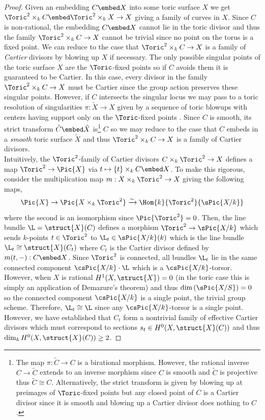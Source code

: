 \begin{proof}
Given an embedding $C \embed X$ into some toric surface $X$ we get $\Toric^2 \times_k C \embed \Toric^2  \times_k X \to X$ giving a family of curves in $X$. Since $C$ is non-rational, the embedding $C \embed X$ cannot lie in the toric divisor and thus the family $\Toric^2 \times_k C \to X$ cannot be trivial since no point on the torus is a fixed point. We can reduce to the case that $\Toric^2 \times_k C \to X$ is a family of \textit{Cartier} divisors by blowing up $X$ if necessary. The only possible singular points of the toric surface $X$ are the $\Toric$-fixed points so if $C$ avoids them it is guaranteed to be Cartier. In this case, every divisor in the family $\Toric^2 \times_k C \to X$ must be Cartier since the group action preserves these singular points. However, if $C$ intersects the singular locus we may pass to a toric resolution of singularities $\pi : \tilde{X} \to X$ given by a sequence of toric blowups with centers having support only on the $\Toric$-fixed points \cite[Thm. 11.1.9]{cox}. Since $C$ is smooth, its strict transform $\tilde{C} \embed \tilde{X}$ is\footnote{The map $\pi : \tilde{C} \to C$ is a birational morphism. However, the rational inverse $C \to \tilde{C}$ extends to an inverse morphism since $C$ is smooth and $\tilde{C}$ is projective thus $\tilde{C} \cong C$. Alternatively, the strict transform is given by blowing up at preimages of $\Toric$-fixed points but any closed point of $C$ is a Cartier divisor since it is smooth and blowing up a Cartier divisor does nothing to $C$.}   $C$ so we may reduce to the case that $C$ embeds in a \textit{smooth} toric surface $\tilde{X}$ and thus $\Toric^2 \times_k C \to X$ is a family of Cartier divisors.
\bigskip\\
Intuitively, the $\Toric^2$-family of Cartier divisors $C \times_k \Toric^2 \to X$ defines a map $\Toric^2 \to \Pic{X}$ via $t \mapsto \{ t \} \times_k C \embed X$. To make this rigorous, consider the multiplication map $m : X \times_k \Toric^2 \to X$ giving the following maps,
\[ \Pic{X} \to \Pic{X \times_k \Toric^2} \xrightarrow{\sim} \Hom{k}{\Toric^2}{\sPic{X/k}} \]
where the second is an isomorphism since $\Pic{\Toric^2} = 0$. Then, the line bundle $\L = \struct{X}(C)$ defines a morphism $\Toric^2 \to \sPic{X/k}$ which sends $k$-points $t \in \Toric^2$ to $\L_t \in \sPic{X/k}(k)$ which is the line bundle $\L_t \cong \struct{X}(C_t)$ where $C_t$ is the Cartier divisor defined by $m(t,-) :  C \embed X$. Since $\Toric^2$ is connected, all bundles $\L_t$ lie in the same connected component $\csPic{X/k} \cdot \L$ which is a $\csPic{X/k}$-torsor. However, when $X$ is rational $H^1(X, \struct{X}) = 0$ (in the toric case this is simply an application of Demazure's theorem) and thus $\dim{(\sPic{X/S})} = 0$ so the connected component $\csPic{X/k}$ is a single point, the trivial group scheme. Therefore, $\L_t \cong \L$ since any $\csPic{X/k}$-torsor is a single point. However, we have established that $C_t$ form a nontrivial family of effective Cartier divisors which must correspond to sections $s_t \in H^0(X, \struct{X}(C))$ and thus $\dim_k H^0(X, \struct{X}(C)) \ge 2$.

\end{proof}
